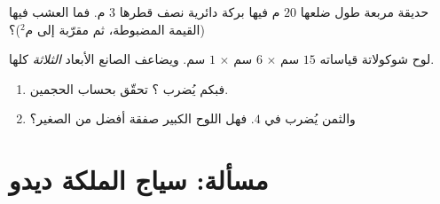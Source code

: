 \begin{exercise}[$\star\star$]\label{exo:g6:measure:11}
حديقة مربعة طول ضلعها $20$ م فيها بركة دائرية نصف
قطرها $3$ م. فما  العشب فيها (القيمة المضبوطة، ثم مقرّبة
إلى م$^2$)؟
\end{exercise}

\begin{exercise}[$\star\star\star$]\label{exo:g6:measure:12}
لوح شوكولاتة قياساته $15$ سم $\times$ $6$ سم $\times$ $1$ سم.
ويضاعف الصانع الأبعاد \emph{الثلاثة} كلها.
\begin{enumerate}
  \item فبكم يُضرب ؟ تحقّق بحساب
        الحجمين.
  \item والثمن يُضرب في $4$. فهل اللوح الكبير صفقة أفضل
        من الصغير؟
\end{enumerate}
\end{exercise}

\section{مسألة: سياج الملكة ديدو}

